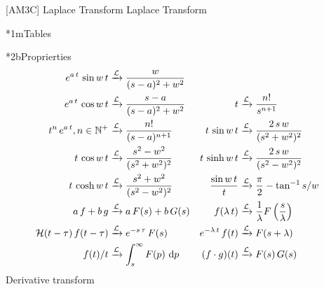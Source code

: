 \documentclass["AM3C-Slides_annotations.tex"]{subfiles}
\begin{document}

[AM3C]
{Laplace Transform} %
{Laplace Transform} %

\begin{sectionBox}*1m{Tables} %
  
  \begin{sectionBox}*2b{Proprierties} %
    \begin{align*}
      e^{a\,t}\,\sin{w\,t}
      &\xrightarrow{\Lapl} 
      \frac{w}{(s-a)^2+w^2}
      \\
      e^{a\,t}\,\cos{w\,t}
      &\xrightarrow{\Lapl} 
      \frac{s-a}{(s-a)^2+w^2}
      &
      t
      &\xrightarrow{\Lapl} 
      \frac{n!}{s^{n+1}}
      \\
      t^n\,e^{a\,t}, n\in\mathbb{N}^+
      &\xrightarrow{\Lapl} 
      \frac{n!}{(s-a)^{n+1}}
      &
      t\,\sin{w\,t}
      &\xrightarrow{\Lapl} 
      \frac{2\,s\,w}{(s^2+w^2)^2}
      \\
      t\,\cos{w\,t}
      &\xrightarrow{\Lapl} 
      \frac{s^2-w^2}{(s^2+w^2)^2}
      &
      t\,\sinh{w\,t}
      &\xrightarrow{\Lapl} 
      \frac{2\,s\,w}{(s^2-w^2)^2}
      \\
      t\,\cosh{w\,t}
      &\xrightarrow{\Lapl} 
      \frac{s^2+w^2}{(s^2-w^2)^2}
      &
      \frac{\sin{w\,t}}{t}
      &\xrightarrow{\Lapl} 
      \frac{\pi}{2}-\tan^{-1}{s/w}
      \\
      a\,f + b\,g 
      &\xrightarrow{\Lapl} 
      a\,F(s) + b\,G(s)
      &
      f(\lambda\,t) 
      &\xrightarrow{\Lapl} 
      \frac{1}{\lambda}F\left(\frac{s}{\lambda}\right)
      \\
      \Heavi(t-\tau)\,f(t-\tau) 
      &\xrightarrow{\Lapl} 
      e^{-s\,\tau}\,F(s)
      &
      e^{-\lambda\,t}\,f(t) 
      &\xrightarrow{\Lapl} 
      F(s+\lambda)
      \\
      f(t)/t 
      &\xrightarrow{\Lapl} 
      \int_{s}^{\infty}{F(p)\,\odif{p}}
      &
      (f \cdot g)(t) 
      &\xrightarrow{\Lapl} 
      F(s)\,G(s)
    \end{align*}
    Derivative transform
    \begin{align*}

\end{align*}
\end{sectionBox}
\end{sectionBox}
\end{document}
